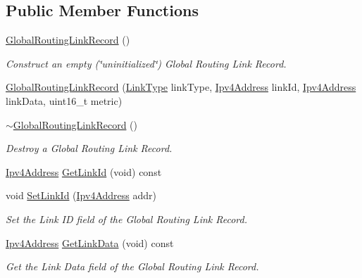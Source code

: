 \subsection*{Public Member Functions}
\begin{DoxyCompactItemize}
\item 
\hyperlink{classns3_1_1GlobalRoutingLinkRecord_af1ba0e9dda45e716000d35e3ca658e0d}{Global\+Routing\+Link\+Record} ()
\begin{DoxyCompactList}\small\item\em Construct an empty (\char`\"{}uninitialized\char`\"{}) Global Routing Link Record. \end{DoxyCompactList}\item 
\hyperlink{classns3_1_1GlobalRoutingLinkRecord_a37eae67499b7106d0eece24e8e462646}{Global\+Routing\+Link\+Record} (\hyperlink{classns3_1_1GlobalRoutingLinkRecord_a9380bcce9bca03943c4761b166a694f4}{Link\+Type} link\+Type, \hyperlink{classns3_1_1Ipv4Address}{Ipv4\+Address} link\+Id, \hyperlink{classns3_1_1Ipv4Address}{Ipv4\+Address} link\+Data, uint16\+\_\+t metric)
\item 
\hyperlink{classns3_1_1GlobalRoutingLinkRecord_af9202da1aaf8a58a650c0c6bfd9e71ca}{$\sim$\+Global\+Routing\+Link\+Record} ()
\begin{DoxyCompactList}\small\item\em Destroy a Global Routing Link Record. \end{DoxyCompactList}\item 
\hyperlink{classns3_1_1Ipv4Address}{Ipv4\+Address} \hyperlink{classns3_1_1GlobalRoutingLinkRecord_a6c48de12faa9110220e2e62bdd54dc05}{Get\+Link\+Id} (void) const 
\item 
void \hyperlink{classns3_1_1GlobalRoutingLinkRecord_a479e71adaa550c4d9d2e100edb642651}{Set\+Link\+Id} (\hyperlink{classns3_1_1Ipv4Address}{Ipv4\+Address} addr)
\begin{DoxyCompactList}\small\item\em Set the Link ID field of the Global Routing Link Record. \end{DoxyCompactList}\item 
\hyperlink{classns3_1_1Ipv4Address}{Ipv4\+Address} \hyperlink{classns3_1_1GlobalRoutingLinkRecord_ab2ce7fa923c2829db0a5e0f184b04dbd}{Get\+Link\+Data} (void) const 
\begin{DoxyCompactList}\small\item\em Get the Link Data field of the Global Routing Link Record. \end{DoxyCompactList}\item 

\end{DoxyCompactItemize}
